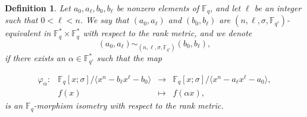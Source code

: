 \documentclass[12pt,paper]{article}
\theoremstyle{plain}
\newtheorem{definition}[theorem]{Definition}
\begin{document}
\begin{definition}\label{DefFqSigma}
Let $a_0, a_{\ell}, b_0, b_{\ell}$ be nonzero elements of $\mathbb{F}_q$, and let $\ell$ be an integer such that $0 < \ell < n$. We say that $(a_0, a_{\ell})$ and $(b_0, b_{\ell})$ are {$( n,\ell,\sigma, \mathbb{F}_{q'})$-equivalent} in $\mathbb{F}_q^* \times \mathbb{F}_q^*$ with respect to the rank metric, and we  denote
$$ (a_0, a_{\ell}) \sim_{( n,\ell,\sigma, \mathbb{F}_{q'})} (b_0, b_{\ell}),$$
if there exists an $\alpha \in \mathbb{F}_{q'}^* $ such that the map

  \begin{equation}
  	\begin{array}{cccc}
  	\varphi_{\alpha}:& \mathbb{F}_q[x;\sigma] /\langle x^n-b_{\ell}x^{\ell}-b_0 \rangle  &\longrightarrow & \mathbb{F}_q[x;\sigma] /\langle x^n-a_{\ell} x^{\ell}-a_0 \rangle, \\ 
  	& f(x) & \longmapsto &  f(\alpha x),
  	\end{array}
  	\end{equation} 
is an  $\mathbb{F}_q$-morphism isometry with respect to the rank metric. 
\end{definition}
\end{document}

